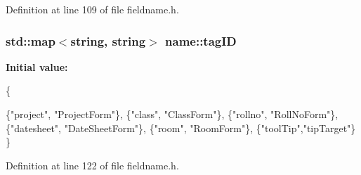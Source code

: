 Definition at line 109 of file fieldname.\-h.

\hypertarget{namespacename_aebc4037a7fbf66bf8e3d947d2245ce81}{
\subsubsection[{tag\-I\-D}]{\setlength{\rightskip}{0pt plus 5cm}std\-::map$<$string, string$>$ name\-::tag\-I\-D}}\label{namespacename_aebc4037a7fbf66bf8e3d947d2245ce81}
{\bfseries Initial value\-:}
\begin{DoxyCode}
 
    \{

        

        \{\textcolor{stringliteral}{"project"}, \textcolor{stringliteral}{"ProjectForm"}\},
        \{\textcolor{stringliteral}{"class"}, \textcolor{stringliteral}{"ClassForm"}\},
        \{\textcolor{stringliteral}{"rollno"}, \textcolor{stringliteral}{"RollNoForm"}\},
        \{\textcolor{stringliteral}{"datesheet"}, \textcolor{stringliteral}{"DateSheetForm"}\},
        \{\textcolor{stringliteral}{"room"}, \textcolor{stringliteral}{"RoomForm"}\},
        \{\textcolor{stringliteral}{"toolTip"},\textcolor{stringliteral}{"tipTarget"}\}
    \}
\end{DoxyCode}


Definition at line 122 of file fieldname.\-h.

